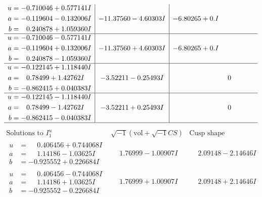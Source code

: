 \documentclass[1p]{elsarticle_modified}
\theoremstyle{definition}
\newcommand{\I}{\sqrt{-1}}
\begin{document}
$$\begin{array}{c|c|c}
\begin{aligned}
u &= -0.710046 + 0.577141 I \\
a &= -0.119604 - 0.132006 I \\
b &= \phantom{-}0.240878 + 1.059360 I\end{aligned}
 & -11.37560 - 4.60303 I & -6.80265 + 0. I\phantom{ +0.000000I} \\ \hline\begin{aligned}
u &= -0.710046 - 0.577141 I \\
a &= -0.119604 + 0.132006 I \\
b &= \phantom{-}0.240878 - 1.059360 I\end{aligned}
 & -11.37560 + 4.60303 I & -6.80265 + 0. I\phantom{ +0.000000I} \\ \hline\begin{aligned}
u &= -0.122145 + 1.118440 I \\
a &= \phantom{-}0.78499 + 1.42762 I \\
b &= -0.862415 + 0.040383 I\end{aligned}
 & -3.52211 - 0.25493 I & \phantom{-0.000000 } 0 \\ \hline\begin{aligned}
u &= -0.122145 - 1.118440 I \\
a &= \phantom{-}0.78499 - 1.42762 I \\
b &= -0.862415 - 0.040383 I\end{aligned}
 & -3.52211 + 0.25493 I & \phantom{-0.000000 } 0\\
 \hline 
 \end{array}$$\newpage$$\begin{array}{c|c|c}  
\text{Solutions to }I^u_{1}& \I (\text{vol} + \sqrt{-1}CS) & \text{Cusp shape}\\
 \hline 
\begin{aligned}
u &= \phantom{-}0.406456 + 0.744068 I \\
a &= \phantom{-}1.14186 - 1.03625 I \\
b &= -0.925552 + 0.226684 I\end{aligned}
 & \phantom{-}1.76999 - 1.00907 I & \phantom{-}2.09148 - 2.14646 I \\ \hline\begin{aligned}
u &= \phantom{-}0.406456 - 0.744068 I \\
a &= \phantom{-}1.14186 + 1.03625 I \\
b &= -0.925552 - 0.226684 I\end{aligned}
 & \phantom{-}1.76999 + 1.00907 I & \phantom{-}2.09148 + 2.14646 I \\ \hline\begin{aligned}

\end{aligned}
\end{array}$$
\end{document}
